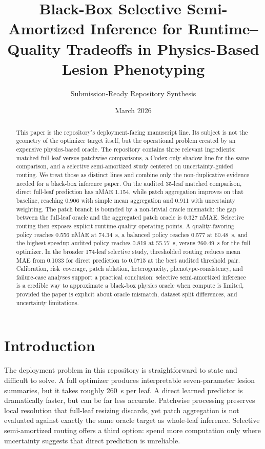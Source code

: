 \documentclass[11pt,a4paper]{article}
\title{Black-Box Selective Semi-Amortized Inference for Runtime--Quality Tradeoffs in Physics-Based Lesion Phenotyping}
\author{Submission-Ready Repository Synthesis}
\date{March 2026}
\newcommand{\nmae}{nMAE}
\begin{document}
\maketitle

\begin{abstract}
This paper is the repository's deployment-facing manuscript line.
Its subject is not the geometry of the optimizer target itself, but the operational problem created by an expensive physics-based oracle.
The repository contains three relevant ingredients: matched full-leaf versus patchwise comparisons, a Codex-only shadow line for the same comparison, and a selective semi-amortized study centered on uncertainty-guided routing.
We treat those as distinct lines and combine only the non-duplicative evidence needed for a black-box inference paper.
On the audited 35-leaf matched comparison, direct full-leaf prediction has \nmae{} 1.154, while patch aggregation improves on that baseline, reaching 0.906 with simple mean aggregation and 0.911 with uncertainty weighting.
The patch branch is bounded by a non-trivial oracle mismatch: the gap between the full-leaf oracle and the aggregated patch oracle is 0.327 \nmae{}.
Selective routing then exposes explicit runtime-quality operating points.
A quality-favoring policy reaches 0.556 \nmae{} at 74.34~s, a balanced policy reaches 0.577 at 60.48~s, and the highest-speedup audited policy reaches 0.819 at 55.77~s, versus 260.49~s for the full optimizer.
In the broader 174-leaf selective study, thresholded routing reduces mean MAE from 0.1033 for direct prediction to 0.0715 at the best audited threshold pair.
Calibration, risk--coverage, patch ablation, heterogeneity, phenotype-consistency, and failure-case analyses support a practical conclusion: selective semi-amortized inference is a credible way to approximate a black-box physics oracle when compute is limited, provided the paper is explicit about oracle mismatch, dataset split differences, and uncertainty limitations.
\end{abstract}

\section{Introduction}
The deployment problem in this repository is straightforward to state and difficult to solve.
A full optimizer produces interpretable seven-parameter lesion summaries, but it takes roughly 260~s per leaf.
A direct learned predictor is dramatically faster, but can be far less accurate.
Patchwise processing preserves local resolution that full-leaf resizing discards, yet patch aggregation is not evaluated against exactly the same oracle target as whole-leaf inference.
Selective semi-amortized routing offers a third option: spend more computation only where uncertainty suggests that direct prediction is unreliable.
\end{document}
